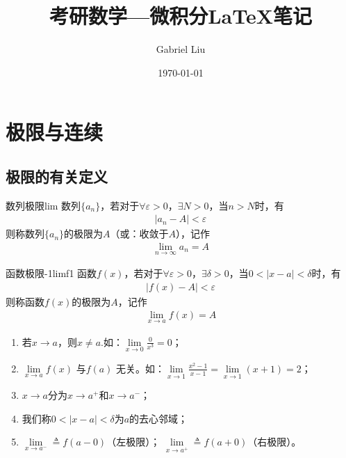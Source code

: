 \documentclass[cn,12pt,chinese]{elegantbook}
\title{考研数学---微积分\LaTeX{}笔记}
\author{Gabriel Liu}
\date{\today}
\begin{document}
\maketitle
\frontmatter
\tableofcontents

\mainmatter
\chapter{极限与连续}
\section{极限的有关定义}
\begin{definition}{数列极限}{lim}
数列$\{a_n\}$，若对于$ \forall\varepsilon>0 $，$ \exists N>0 $，当$ n>N $时，有
\begin{align}
    \vert{a_n-A}\vert<\varepsilon
\end{align}
则称数列$\{a_n\}$的极限为$A$（或：收敛于$A$），记作
\begin{align}
    \lim_{n\to \infty} a_n=A 
\end{align}
\end{definition}



\begin{definition}{函数极限-1}{limf1}
函数$f(x)$，若对于$ \forall\varepsilon>0 $，$ \exists \delta>0 $，当$ 0<\vert x-a\vert <\delta $时，有
\begin{align}
    \vert{f(x)-A}\vert<\varepsilon
\end{align}
则称函数$f(x)$的极限为$A$，记作
\begin{align}
    \lim_{x\to a} f(x)=A 
\end{align}
\end{definition}

\begin{note}
\begin{enumerate}
    \item 若$x \to a$，则$x\neq a$.如：$ \lim\limits_{x\to 0}\displaystyle\frac{0}{x^3}=0 $；
    \item $\lim\limits_{x \to a}f(x)$ 与$ f(a) $ 无关。如：$\lim\limits_{x \to 1}\displaystyle\frac{x^2-1}{x-1}=\lim\limits_{x \to 1}(x+1)=2$；
    \item $x \to a$分为$ x \to a^{+} $和$ x \to a^{-}$；
    \item 我们称$0<\vert x-a\vert <\delta$为$ a $的去心邻域；
    \item $\lim\limits_{x \to a^-}\triangleq f(a-0)$（左极限）；
    $\lim\limits_{x \to a^+}\triangleq f(a+0)$（右极限）。
\end{enumerate}
\end{note}
\end{document}
